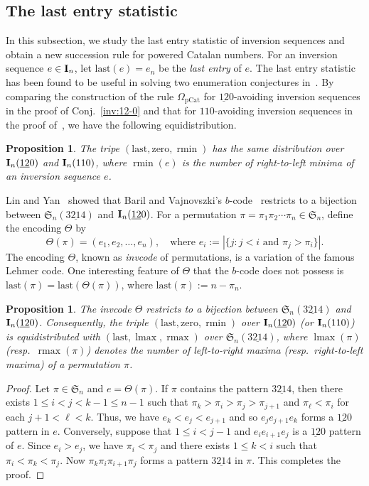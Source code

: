 \documentclass[12pt,A4]{amsart}
\numberwithin{equation}{section}
\theoremstyle{plain}
\newtheorem{proposition}[theorem]{Proposition}
\theoremstyle{definition}
\def\S{\mathfrak{S}}
\def\last{\mathrm{last}}
\def\zero{\mathrm{zero}}
\def\I{\operatorname{{\bf I}}}
\def\rmin{\operatorname{rmin}}
\def\rmax{\operatorname{rmax}}
\def\lmax{\operatorname{lmax}}
\begin{document}
\subsection{The last entry statistic} In this subsection, we study the last entry statistic of inversion sequences and obtain a new succession rule for powered Catalan numbers. For an inversion sequence $e\in\I_n$, let $\last(e)=e_n$ be the {\em last entry} of $e$. The last entry statistic has been found to be useful in solving  two enumeration conjectures in~\cite{kl2}. By comparing the construction of the rule $\Omega_{\mathrm{pCat}}$ for $\underline{12}0$-avoiding inversion sequences in the proof of Conj.~\ref{inv:12-0} and that for $110$-avoiding inversion sequences in the proof of~\cite[Prop.~19]{bbgr}, we have the following equidistribution. 
\begin{proposition}
The tripe $(\last,\zero,\rmin)$ has the same distribution over $\I_n(\underline{12}0)$ and $\I_n(110)$, where $\rmin(e)$ is the number of right-to-left minima of an inversion sequence $e$. 
\end{proposition}

Lin and Yan~\cite[Lem.~2.19]{ly} showed that Baril and Vajnovszki's $b$-code~\cite{bv} restricts  to  a bijection between $\S_n(3\underline{21}4)$ and $\I_n(\underline{12}0)$. 
 For a permutation $\pi=\pi_1\pi_2\cdots\pi_n\in\S_n$, define the encoding $\Theta$ by
$$
\Theta(\pi)=(e_1,e_2,\ldots,e_n),\quad\text{where $e_i:=\left|\{j: \text{$j<i$ and $\pi_j>\pi_i$}\}\right|$}.
$$
The encoding $\Theta$,  known as {\em invcode} of permutations, is a variation of the famous Lehmer code. 
One interesting feature of $\Theta$ that the $b$-code does not possess is
$\last(\pi)=\last(\Theta(\pi))$,
where $\last(\pi):=n-\pi_n$.

\begin{proposition}
The invcode $\Theta$ restricts to a bijection between $\S_n(3\underline{21}4)$ and $\I_n(\underline{12}0)$. 
Consequently, the triple  $(\last,\zero,\rmin)$ over $\I_n(\underline{12}0)$ (or  $\I_n(110)$) is equidistributed with $(\last,\lmax,\rmax)$ over $\S_n(3\underline{21}4)$, where $\lmax(\pi)$ (resp.~$\rmax(\pi)$) denotes  the number of left-to-right maxima (resp.~right-to-left maxima) of a permutation $\pi$.
\end{proposition}
\begin{proof}
Let $\pi\in\S_n$ and $e=\Theta(\pi)$. If $\pi$ contains the pattern $3\underline{21}4$, then there exists $1\leq i<j<k-1\leq n-1$ such that  $\pi_k>\pi_i>\pi_j>\pi_{j+1}$ and $\pi_{\ell}<\pi_i$ for each $j+1<\ell<k$. 
Thus, we have  $e_k<e_j<e_{j+1}$ and so $e_je_{j+1}e_k$ forms a $\underline{12}0$ pattern in $e$. Conversely, suppose that $1\leq i<j-1$ and $e_ie_{i+1}e_j$ is a $\underline{12}0$ pattern of $e$. Since $e_i>e_j$, we have $\pi_i<\pi_j$ and there exists $1\leq k<i$ such that $\pi_i<\pi_k<\pi_j$. Now $\pi_k\pi_i\pi_{i+1}\pi_j$ forms a pattern $3\underline{21}4$ in $\pi$. This completes the proof.
\end{proof}
\end{document}
